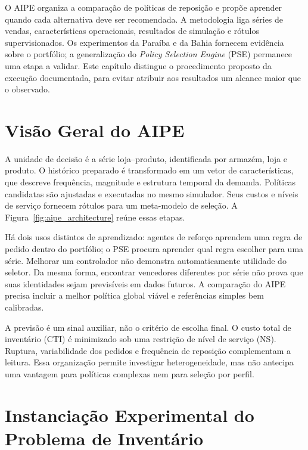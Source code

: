 
O AIPE organiza a comparação de políticas de reposição e propõe aprender quando cada alternativa deve ser recomendada. A metodologia liga séries de vendas, características operacionais, resultados de simulação e rótulos supervisionados. Os experimentos da Paraíba e da Bahia fornecem evidência sobre o portfólio; a generalização do \textit{Policy Selection Engine} (PSE) permanece uma etapa a validar. Este capítulo distingue o procedimento proposto da execução documentada, para evitar atribuir aos resultados um alcance maior que o observado.

\section{Visão Geral do AIPE}
\label{sec:visao_geral_aipe}

A unidade de decisão é a série loja--produto, identificada por armazém, loja e produto. O histórico preparado é transformado em um vetor de características, que descreve frequência, magnitude e estrutura temporal da demanda. Políticas candidatas são ajustadas e executadas no mesmo simulador. Seus custos e níveis de serviço fornecem rótulos para um meta-modelo de seleção. A Figura~\ref{fig:aipe_architecture} reúne essas etapas.



Há dois usos distintos de aprendizado: agentes de reforço aprendem uma regra de pedido dentro do portfólio; o PSE procura aprender qual regra escolher para uma série. Melhorar um controlador não demonstra automaticamente utilidade do seletor. Da mesma forma, encontrar vencedores diferentes por série não prova que suas identidades sejam previsíveis em dados futuros. A comparação do AIPE precisa incluir a melhor política global viável e referências simples bem calibradas.

A previsão é um sinal auxiliar, não o critério de escolha final. O custo total de inventário (CTI) é minimizado sob uma restrição de nível de serviço (NS). Ruptura, variabilidade dos pedidos e frequência de reposição complementam a leitura. Essa organização permite investigar heterogeneidade, mas não antecipa uma vantagem para políticas complexas nem para seleção por perfil.

\section{Instanciação Experimental do Problema de Inventário}
\label{sec:formulacao}
